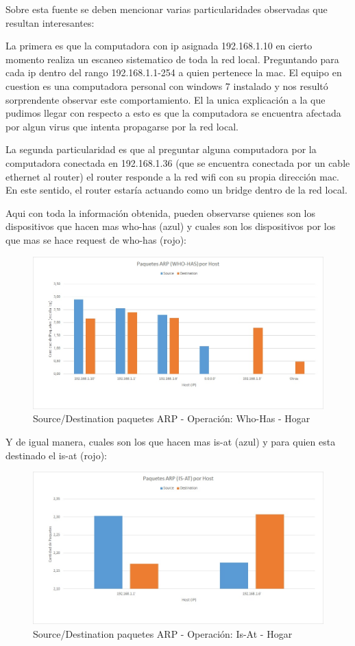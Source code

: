 Sobre esta fuente se deben mencionar varias particularidades observadas que resultan interesantes:

La primera es que la computadora con ip asignada 192.168.1.10 en cierto momento realiza un escaneo sistematico de toda la red local. Preguntando para cada ip dentro del rango 192.168.1.1-254 a quien pertenece la mac. El equipo en cuestion es una computadora personal con windows 7 instalado y nos resultó sorprendente observar este comportamiento. El la unica explicación a la que pudimos llegar con respecto a esto es que la computadora se encuentra afectada por algun virus que intenta propagarse por la red local.

La segunda particularidad es que al preguntar alguna computadora por la computadora conectada en 192.168.1.36 (que se encuentra conectada por un cable ethernet al router) el router responde a la red wifi con su propia dirección mac. En este sentido, el router estaría actuando como un bridge dentro de la red local.

Aqui con toda la información obtenida, pueden observarse quienes son los dispositivos que hacen mas who-has (azul) y cuales son los dispositivos por los que mas se hace request de who-has (rojo):

\begin{figure}[h!]
\centering
\includegraphics[width=\textwidth]{./img/arp_whoHas_casa.jpg}
\caption{Source/Destination paquetes ARP - Operación: Who-Has - Hogar}
\end{figure}

Y de igual manera, cuales son los que hacen mas is-at (azul) y para quien esta destinado el is-at (rojo):

\begin{figure}[h!]
\centering
\includegraphics[width=\textwidth]{./img/arp_isAt_casa.jpg}
\caption{Source/Destination paquetes ARP - Operación: Is-At - Hogar}
\end{figure}


